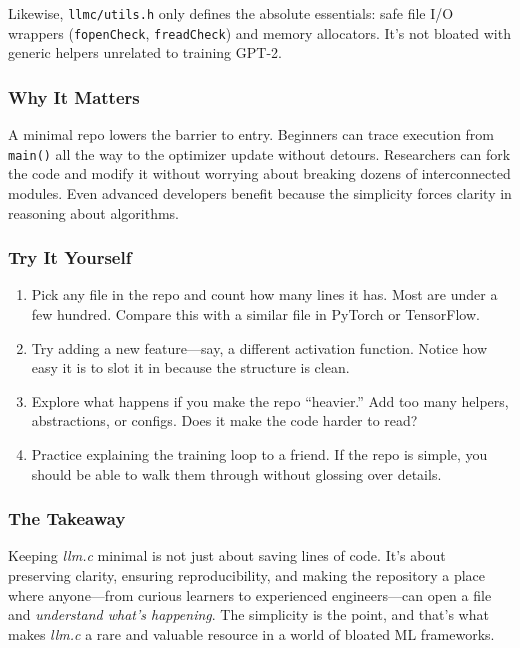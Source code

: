 \documentclass[
  letterpaper,
  DIV=11,
  numbers=noendperiod]{scrreprt}
\providecommand{\tightlist}{%
  \setlength{\itemsep}{0pt}\setlength{\parskip}{0pt}}
\begin{document}
Likewise, \texttt{llmc/utils.h} only defines the absolute essentials:
safe file I/O wrappers (\texttt{fopenCheck}, \texttt{freadCheck}) and
memory allocators. It's not bloated with generic helpers unrelated to
training GPT-2.

\subsubsection{Why It Matters}\label{why-it-matters-64}

A minimal repo lowers the barrier to entry. Beginners can trace
execution from \texttt{main()} all the way to the optimizer update
without detours. Researchers can fork the code and modify it without
worrying about breaking dozens of interconnected modules. Even advanced
developers benefit because the simplicity forces clarity in reasoning
about algorithms.

\subsubsection{Try It Yourself}\label{try-it-yourself-78}

\begin{enumerate}
\def\labelenumi{\arabic{enumi}.}
\tightlist
\item
  Pick any file in the repo and count how many lines it has. Most are
  under a few hundred. Compare this with a similar file in PyTorch or
  TensorFlow.
\item
  Try adding a new feature---say, a different activation function.
  Notice how easy it is to slot it in because the structure is clean.
\item
  Explore what happens if you make the repo ``heavier.'' Add too many
  helpers, abstractions, or configs. Does it make the code harder to
  read?
\item
  Practice explaining the training loop to a friend. If the repo is
  simple, you should be able to walk them through without glossing over
  details.
\end{enumerate}

\subsubsection{The Takeaway}\label{the-takeaway-79}

Keeping \emph{llm.c} minimal is not just about saving lines of code.
It's about preserving clarity, ensuring reproducibility, and making the
repository a place where anyone---from curious learners to experienced
engineers---can open a file and \emph{understand what's happening}. The
simplicity is the point, and that's what makes \emph{llm.c} a rare and
valuable resource in a world of bloated ML frameworks.
\end{document}
